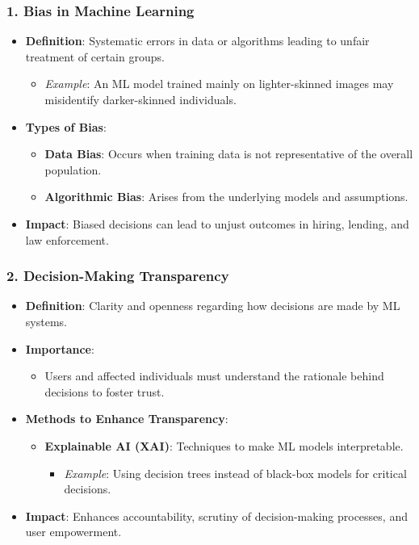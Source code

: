 \documentclass{beamer}
\begin{document}
\begin{frame}[fragile]
    \frametitle{1. Bias in Machine Learning}
    \begin{itemize}
        \item \textbf{Definition}: Systematic errors in data or algorithms leading to unfair treatment of certain groups.
        \begin{itemize}
            \item \textit{Example}: An ML model trained mainly on lighter-skinned images may misidentify darker-skinned individuals.
        \end{itemize}
        \item \textbf{Types of Bias}:
            \begin{itemize}
                \item \textbf{Data Bias}: Occurs when training data is not representative of the overall population.
                \item \textbf{Algorithmic Bias}: Arises from the underlying models and assumptions.
            \end{itemize}
        \item \textbf{Impact}: Biased decisions can lead to unjust outcomes in hiring, lending, and law enforcement.
    \end{itemize}
\end{frame}

\begin{frame}[fragile]
    \frametitle{2. Decision-Making Transparency}
    \begin{itemize}
        \item \textbf{Definition}: Clarity and openness regarding how decisions are made by ML systems.
        \item \textbf{Importance}:
            \begin{itemize}
                \item Users and affected individuals must understand the rationale behind decisions to foster trust. 
            \end{itemize}
        \item \textbf{Methods to Enhance Transparency}:
            \begin{itemize}
                \item \textbf{Explainable AI (XAI)}: Techniques to make ML models interpretable.
                \begin{itemize}
                    \item \textit{Example}: Using decision trees instead of black-box models for critical decisions.
                \end{itemize}
            \end{itemize}
        \item \textbf{Impact}: Enhances accountability, scrutiny of decision-making processes, and user empowerment.
    \end{itemize}
\end{frame}
\end{document}
